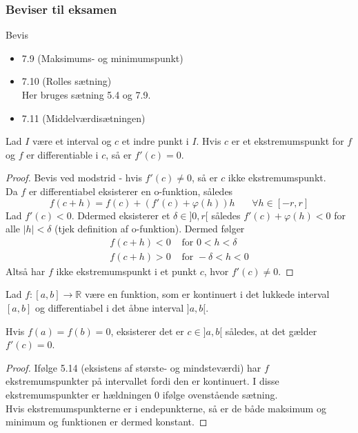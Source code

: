 \subsubsection{Beviser til eksamen}
Bevis
\begin{itemize}
\setlength\itemsep{0em}
\item 7.9 (Maksimums- og minimumspunkt)
\item 7.10 (Rolles sætning)\\
Her bruges sætning 5.4 og 7.9.
\item 7.11 (Middelværdisætningen)
\end{itemize}
\clearpage
\begin{theorem}
Lad $I$ være et interval og $c$ et indre punkt i $I$. Hvis $c$ er et ekstremumspunkt for $f$ og $f$ er differentiable i $c$, så er $f'(c)=0$.
\end{theorem}
\begin{proof}
Bevis ved modstrid - hvis $f'(c)\neq 0$, så er $c$ ikke ekstremumspunkt.\\
Da $f$ er differentiabel eksisterer en o-funktion, således
\begin{equation}
f(c+h)=f(c)+(f'(c)+\varphi(h))h\phantom{mm} \forall h\in[-r,r]
\end{equation}
Lad $f'(c)<0$. Ddermed eksisterer et $\delta\in]0,r[$ således $f'(c)+\varphi(h)<0$ for alle $|h|<\delta$ (tjek definition af o-funktion). Dermed følger
\begin{align}
f(c+h)<0&\text{ for }0<h<\delta\\
f(c+h)>0&\text{ for }-\delta<h<0
\end{align}
Altså har $f$ ikke ekstremumspunkt i et punkt $c$, hvor $f'(c)\neq 0$.
\end{proof}
\begin{theorem}
Lad $f:[a,b]\to\mathbb{R}$ være en funktion, som er kontinuert i det lukkede interval $[a,b]$ og differentiabel i det åbne interval $]a,b[$.\\
\centerline{Hvis $f(a)=f(b)=0$, eksisterer det er $c\in]a,b[$ således, at det gælder $f'(c)=0$.}
\end{theorem}
\begin{proof}
Ifølge 5.14 (eksistens af største- og mindsteværdi) har $f$ ekstremumspunkter på intervallet fordi den er kontinuert. I disse ekstremumspunkter er hældningen 0 ifølge ovenstående sætning.\\
Hvis ekstremumspunkterne er i endepunkterne, så er  de både maksimum og minimum og funktionen er dermed konstant.
\end{proof}
